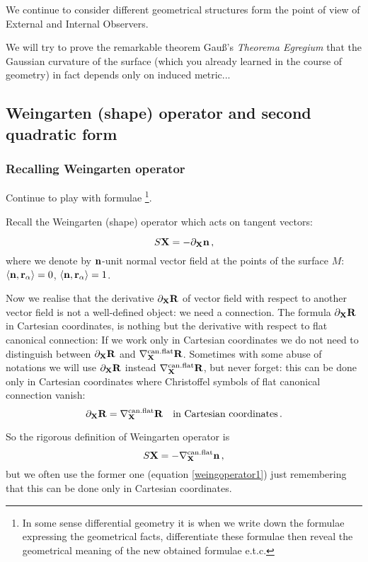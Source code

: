 \documentclass[12pt]{article}
\theoremstyle{theorem}
\numberwithin{equation}{section}
\begin{document}
 We continue to consider different geometrical structures form the point of view of External and Internal Observers.

 We will try to prove the remarkable theorem Gau\ss's {\it Theorema Egregium} that the Gaussian  curvature
 of the surface (which you already learned in the course of geometry)  in fact depends only on induced metric...

 \subsection {Weingarten (shape) operator and second quadratic form}

   \subsubsection {Recalling Weingarten operator}

 Continue to play with formulae \footnote{In some sense differential geometry it is when we write down
 the formulae expressing the geometrical facts, differentiate these formulae then reveal the geometrical meaning
  of the new obtained formulae e.t.c.}.


Recall the Weingarten (shape) operator which acts on tangent vectors:

  \begin{equation}\label{weingoperator1}
    S{\bf X}=-\partial_{\bf X} {\bf n}\,,
  \end{equation}
 where we denote by ${\bf n}$-unit normal vector field at the points of the surface $M$: $\langle{\bf n},{\bf r}_\alpha\rangle=0$,
 $\langle{\bf n},{\bf r}_\alpha\rangle=1$.

\m

 Now we realise that the derivative $\partial_{\bf X} {\bf R}$ of vector field with respect to another vector field
 is not a well-defined object: we need a connection.
 The formula $\partial_{\bf X} {\bf R}$ in Cartesian coordinates,
 is nothing but the derivative with respect to flat canonical connection:
 If we work only in Cartesian coordinates we do not need to distinguish between
 $\partial_{\bf X} {\bf R}$ and $\nabla^{\rm can.flat}_{\bf X}{\bf R} $. Sometimes with some abuse of notations we will use
 $\partial_{\bf X} {\bf R}$ instead $\nabla^{\rm can.flat}_{\bf X}{\bf R} $, but never forget: this can be done only in Cartesian coordinates
 where Christoffel symbols of flat canonical connection vanish:
              $$
      \partial_{\bf X} {\bf R}=\nabla^{\rm can.flat}_{\bf X}{\bf R}  \quad \hbox{in Cartesian coordinates}\,.
         $$

 So  the rigorous definition of Weingarten operator is
\begin{equation}\label{weingoperator2}
    S{\bf X}=-\nabla^{\rm can.flat}_{\bf X} {\bf n}\,,
  \end{equation}
  but we often use the former one (equation \eqref{weingoperator1})
   just remembering that this can be done only in Cartesian coordinates.
\end{document}
